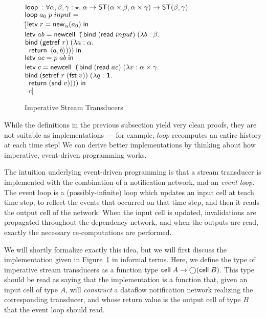 \begin{figure}
\begin{tabbing}
$\mathsf{loop}\; : \forall \alpha,\beta,\gamma:\star.\; \alpha \to \mathsf{ST}({\alpha\times \beta}, {\alpha\times \gamma}) \to \mathsf{ST}({\beta}, {\gamma})$ \\
$\mathsf{loop}\; a_0\; p \; input = $ \\
\;\;$[$\=$\mathsf{letv}\;r = \mathsf{new}_{\alpha}(a_0)\;\mathsf{in}\;$ \\
    \>$\mathsf{letv}\; ab = \mathsf{newcell}\;\; ($\=$\mathsf{bind}\; (\mathsf{read}\; input)\; (\lambda b:\beta.$ \\
    \>                                \>$\mathsf{bind}\; (\mathsf{getref}\; r)\;       (\lambda a:\alpha.$ \\
    \>                                \>$\;\; \mathsf{return}\; \left<{a},{b}\right>))) \;\mathsf{in}$ \\
    \>$\mathsf{letv}\;ac = p\;ab\;\mathsf{in}\;$ \\
    \>$\mathsf{letv}\;c = \mathsf{newcell}\;\; ($\=$\mathsf{bind}\; (\mathsf{read}\; ac) \;(\lambda v:\alpha \times \gamma.$ \\
    \>                              \>$\mathsf{bind}\; (\mathsf{setref}\; r\;(\mathsf{fst}\; v)) \;(\lambda q:\mathbf{1}.$ \\
    \>                              \>$\;\;\mathsf{return}\; (\mathsf{snd}\; v))))\;\mathsf{in}$ \\
    \>$\;\;c]$ 
\end{tabbing}
\caption{Imperative Stream Transducers}
\label{imperative-transducer-impl}
\end{figure}

While the definitions in the previous subsection yield very clean
proofs, they are not suitable as implementations --- for example,
$loop$ recomputes an entire history at each time step! We can derive
better implementations by thinking about how imperative, event-driven
programming works.

The intuition underlying event-driven programming is that a stream
transducer is implemented with the combination of a notification
network, and an \emph{event loop}.  The event loop is a
(possibly-infinite) loop which updates an input cell at teach time
step, to reflect the events that occurred on that time step, and then
it reads the output cell of the network. When the input cell is
updated, invalidations are propagated throughout the dependency
network, and when the outputs are read, exactly the necessary
re-computations are performed.

We will shortly formalize exactly this idea, but we will first discuss
the implementation given in
Figure~\ref{imperative-transducer-impl} in informal terms. Here,
we define the type of imperative stream transducers as a function type
$\mathsf{cell}\;{A} \to \bigcirc{(\mathsf{cell}\;{B})}$. This type should be read as
saying that the implementation is a function that, given an input cell
of type $A$, will \emph{construct} a dataflow notification network
realizing the corresponding transducer, and whose return value is the
output cell of type $B$ that the event loop should read. 

